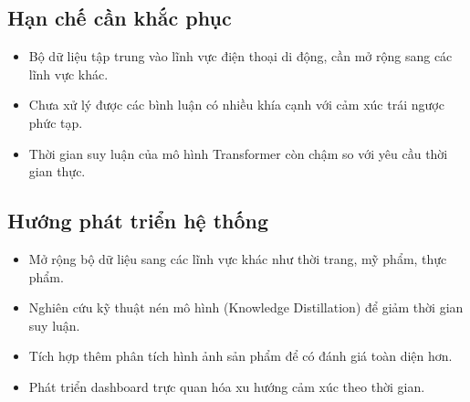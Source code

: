 \subsection{Hạn chế cần khắc phục}
\begin{itemize}
    \item Bộ dữ liệu tập trung vào lĩnh vực điện thoại di động, cần mở rộng sang các lĩnh vực khác.
    \item Chưa xử lý được các bình luận có nhiều khía cạnh với cảm xúc trái ngược phức tạp.
    \item Thời gian suy luận của mô hình Transformer còn chậm so với yêu cầu thời gian thực.
\end{itemize}

\subsection{Hướng phát triển hệ thống}
\begin{itemize}
    \item Mở rộng bộ dữ liệu sang các lĩnh vực khác như thời trang, mỹ phẩm, thực phẩm.
    \item Nghiên cứu kỹ thuật nén mô hình (Knowledge Distillation) để giảm thời gian suy luận.
    \item Tích hợp thêm phân tích hình ảnh sản phẩm để có đánh giá toàn diện hơn.
    \item Phát triển dashboard trực quan hóa xu hướng cảm xúc theo thời gian.
\end{itemize}



